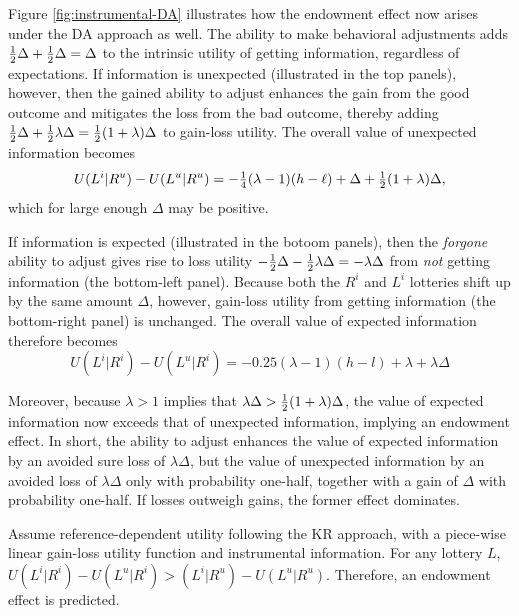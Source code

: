 Figure \ref{fig:instrumental-DA} illustrates how the endowment effect now arises under the DA approach as well. The ability to make behavioral adjustments adds $\tfrac{1}{2} \Delta + \tfrac{1}{2} \Delta = \Delta$ to the intrinsic utility of getting information, regardless of expectations. If information is unexpected (illustrated in the top panels), however, then the gained ability to adjust enhances the gain from the good outcome and mitigates the loss from the bad outcome, thereby adding $\tfrac{1}{2} \Delta + \tfrac{1}{2} \lambda \Delta = \tfrac{1}{2} (1 + \lambda) \Delta$ to gain-loss utility. The overall value of unexpected information becomes
\begin{equation*}
  U(L^i|R^u)-U(L^u|R^u)=-\tfrac{1}{4}(\lambda-1)(h-\ell)+\Delta +\tfrac{1}{2}(1+\lambda)\Delta,
\end{equation*}
which for large enough $\Delta$ may be positive.

If information is expected (illustrated in the botoom panels), then the \emph{forgone} ability to adjust gives rise to loss utility $-\tfrac{1}{2} \Delta - \tfrac{1}{2} \lambda \Delta = -\lambda \Delta$ from \emph{not} getting information (the bottom-left panel). Because both the $R^i$ and $L^i$ lotteries shift up by the same amount $\Delta$, however, gain-loss utility from getting information (the bottom-right panel) is unchanged. The overall value of expected information therefore becomes
\begin{equation*}
  U(L^i|R^i)-U(L^u|R^i)=-0.25(\lambda-1)(h-l)+\lambda +\lambda \Delta
\end{equation*}

Moreover, because $\lambda>1$ implies that $\lambda \Delta > \tfrac{1}{2}(1+\lambda)\Delta$, the value of expected information now exceeds that of unexpected information, implying an endowment effect. In short, the ability to adjust enhances the value of expected information by an avoided sure loss of $\lambda \Delta$, but the value of unexpected information by an avoided loss of $\lambda \Delta$ only with probability one-half, together with a gain of $\Delta$ with probability one-half. If losses outweigh gains, the former effect dominates.

\FloatBarrier

\begin{prop}
  Assume reference-dependent utility following the KR approach, with a piece-wise linear gain-loss utility function and instrumental information. For any lottery $L$, $U(L^i|R^i)-U(L^u|R^i)>(L^i|R^u)-U(L^u|R^u)$. Therefore, an endowment effect is predicted.
  \label{prop:instrumental-KR}
\end{prop}

